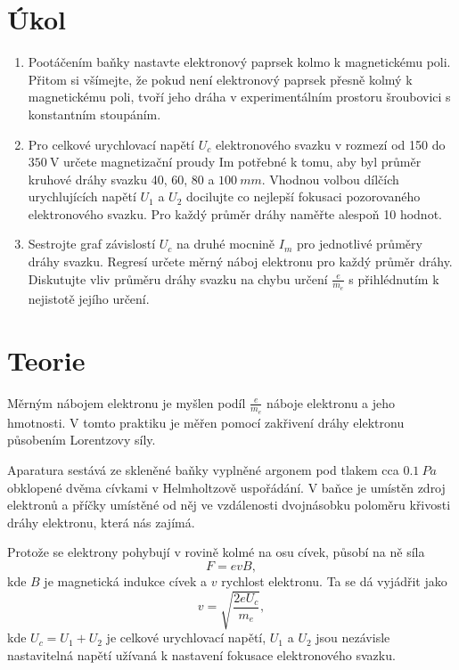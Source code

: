 \documentclass{protokol}
\begin{document}
  \section*{Úkol}

    \begin{enumerate}
      \item Pootáčením baňky nastavte elektronový paprsek kolmo k magnetickému poli. Přitom si všímejte, že pokud není elektronový paprsek přesně kolmý k magnetickému poli, tvoří jeho dráha v experimentálním prostoru šroubovici s konstantním stoupáním.
      \item Pro celkové urychlovací napětí $U_c$ elektronového svazku v rozmezí od 150 do $\SI{350}{\volt}$ určete magnetizační proudy Im potřebné k tomu, aby byl průměr kruhové dráhy svazku 40, 60, 80 a $\SI{100}{mm}$. Vhodnou volbou dílčích urychlujících napětí $U_1$ a $U_2$ docilujte co nejlepší fokusaci pozorovaného elektronového svazku. Pro každý průměr dráhy naměřte alespoň 10 hodnot.
      \item Sestrojte graf závislostí $U_c$ na druhé mocnině $I_m$ pro jednotlivé průměry dráhy svazku. Regresí určete měrný náboj elektronu pro každý průměr dráhy. Diskutujte vliv průměru dráhy svazku na chybu určení $\frac{ e }{ m_e }$ s přihlédnutím k nejistotě jejího určení.
    \end{enumerate} 

  \section*{Teorie}

    Měrným nábojem elektronu je myšlen podíl $\frac{e}{m_e}$ náboje elektronu a jeho hmotnosti. V tomto praktiku je měřen pomocí zakřivení dráhy elektronu působením Lorentzovy síly.

    Aparatura sestává ze skleněné baňky vyplněné argonem pod tlakem cca $\SI{0.1}{Pa}$ obklopené dvěma cívkami v Helmholtzově uspořádání. V baňce je umístěn zdroj elektronů a příčky umístěné od něj ve vzdálenosti dvojnásobku poloměru křivosti dráhy elektronu, která nás zajímá. 

    Protože se elektrony pohybují v rovině kolmé na osu cívek, působí na ně síla
    \begin{equation}
      \label{eq:lorentz}
      F = evB,
    \end{equation}
    kde $B$ je magnetická indukce cívek a $v$ rychlost elektronu. Ta se dá vyjádřit jako 
    \begin{equation}
      \label{eq:rychlost}
      v = \sqrt{\frac{ 2eU_c }{ m_e }},
    \end{equation}
    kde $U_c = U_1 + U_2$ je celkové urychlovací napětí, $U_1$ a $U_2$ jsou nezávisle nastavitelná napětí užívaná k nastavení fokusace elektronového svazku.
\end{document}
